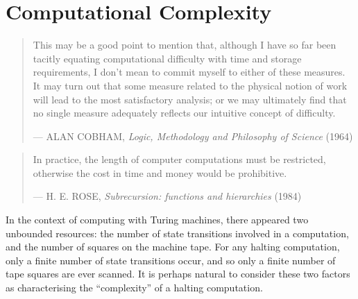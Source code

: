 \chapter{Computational Complexity}

\begin{quotation}

\footnotesize\sffamily\itshape

\begin{flushright}

This may be a good point to mention that, although I have so far been tacitly
equating computational difficulty with time and storage requirements, I don't
mean to commit myself to either of these measures. It may turn out that some
measure related to the physical notion of work will lead to the most
satisfactory analysis; or we may ultimately find that no single measure
adequately reflects our intuitive concept of difficulty.

\smallbreak

\upshape

--- ALAN COBHAM, {\itshape Logic, Methodology and Philosophy of Science} (1964)

\end{flushright}

\end{quotation}

\begin{quotation}

\footnotesize\sffamily\itshape

\begin{flushright}

In practice, the length of computer computations must be restricted, otherwise
the cost in time and money would be prohibitive.

\smallbreak

\upshape

--- H. E. ROSE, {\itshape Subrecursion: functions and hierarchies} (1984)

\end{flushright}

\end{quotation}


In the context of computing with Turing machines, there appeared two unbounded
resources: the number of state transitions involved in a computation, and the
number of squares on the machine tape. For any halting computation, only a
finite number of state transitions occur, and so only a finite number of tape
squares are ever scanned. It is perhaps natural to consider these two factors
as characterising the ``complexity'' of a halting computation.

